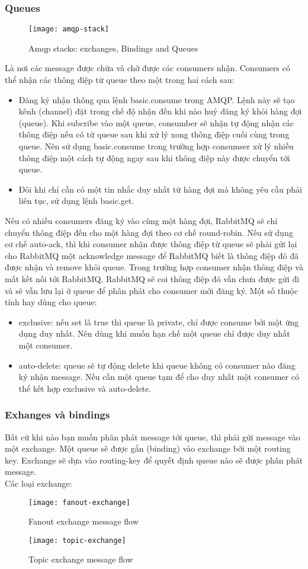 \subsubsection{Queues}
\begin{figure}[h]
    \centering
    \texttt{[image: amqp-stack]}
    \caption{Amqp stacks: exchanges, Bindings and Queues}
    \label{fig:mesh1}
\end{figure}
Là nơi các message được chứa và chờ được các consumers nhận. Consumers có thể nhận các thông điệp từ queue theo một trong hai cách sau:
\begin{itemize}
	\item Đăng ký nhận thông qua lệnh basic.consume trong AMQP. Lệnh này sẽ tạo kênh (channel) đặt trong chế độ nhận đến khi nào huỷ đăng ký khỏi hàng đợi (queue). Khi subcribe vào một queue, consumber sẽ nhận tự động nhận các thông điệp nếu có từ queue sau khi xử lý xong thông điệp cuối cùng trong queue. Nên sử dụng basic.consume trong trường hợp consumser xử lý nhiều thông điệp một cách tự động ngay sau khi thông điệp này được chuyển tới queue.
	\item Đôi khi chỉ cần có một tin nhắc duy nhất từ hàng đợi mà không yêu cầu phải liên tục, sử dụng lệnh basic.get. 	
\end{itemize}
Nếu có nhiều consumers đăng ký vào cùng một hàng đợi, RabbitMQ sẽ chỉ chuyển thông điệp đến cho một hàng đợi theo cơ chế round-robin. 
\newline
Nếu sử dụng cơ chế auto-ack, thì khi consumer nhận được thông điệp từ queue sẽ phải gửi lại cho RabbitMQ một acknowledge message để  RabbitMQ biết là thông điệp đó đã được nhận và remove khỏi queue. Trong trường hợp consumer nhận thông điệp và mất kết nối tới RabbitMQ, RabbitMQ sẽ coi thông điệp đó vẫn chưa được gửi đi và sẽ vẫn lưu lại ở queue để phân phát cho consumer mới đăng ký.
\newline
Một số thuộc tính hay dùng cho queue:
\begin{itemize}
	\item exclusive: nếu set là true thì queue là private, chỉ được consume bởi một ứng dụng duy nhất. Nên dùng khi muốn hạn chế một queue chỉ được duy nhất một consumer.
	\item auto-delete: queue sẽ tự động delete khi queue không có consumer nào đăng ký nhận message. Nếu cần một queue tạm để cho duy nhất một consumer có thể kết hợp exclusive và auto-delete.
\end{itemize}

\subsubsection{Exhanges và bindings}
Bất cứ khi nào bạn muốn phân phát message tới queue, thì phải gửi message vào một exchange. Một queue sẽ được gắn (binding) vào exchange bởi một routing key. Exchange sẽ dựa vào routing-key để quyết định queue nào sẽ được phân phát message. \\
Các loại exchange:
\begin{figure}[h]
    \centering
    \texttt{[image: fanout-exchange]}
    \caption{Fanout exchange message flow}
    \label{fig:mesh1}
\end{figure}

\begin{figure}[h]
    \centering
    \texttt{[image: topic-exchange]}
    \caption{Topic exchange message flow}
    \label{fig:mesh1}
\end{figure}
